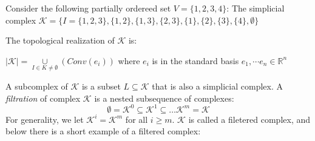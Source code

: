 \documentclass[11pt,a4paper]{report}
\begin{document}
            
            \begin{Ex}
              Consider the following partially ordereed set  $ V = \{1, 2, 3, 4\}$: 
              The simplicial complex 
              $\mathcal{K} = \{I = \{1, 2, 3\}, \{1, 2\}, \{1, 3\}, \{2, 3\}, \{1\}, \{2\}, \{3\}, \{4\}, \emptyset\}$
             
             \begin{center}
              

             
             \end{center}
             The topological realization of $\mathcal{K}$ is: 
             
              $|\mathcal{K}| = \underset{I\in K \ne \emptyset}{\cup} (Conv(e_i))$ where $e_i$ is in the standard basis $e_1, \cdots e_n \in \mathbb{R}^n$ 
            \end{Ex}
            
            A subcomplex of $\mathcal{K}$ is a subset $L \subseteq \mathcal{K}$ that is also a simplicial complex.
            A \emph{filtration} of complex $\mathcal{K}$ is a nested subsequence of complexes: 
             \[
              \emptyset = \mathcal{K}^0 \subseteq \mathcal{K}^1 \subseteq \dots \mathcal{K}^m = \mathcal{K}  
             \]
             For generality, we let $\mathcal{K}^i = \mathcal{K}^m$ for all $i \geq m$. $\mathcal{K}$ is called a filetered complex, and below there is a short example of a filtered complex: 
             
\end{document}
